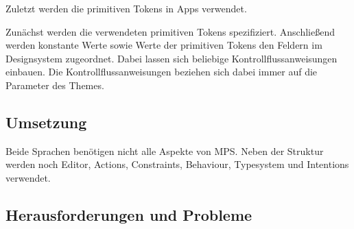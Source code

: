 Zuletzt werden die primitiven Tokens in Apps verwendet.

Zunächst werden die verwendeten primitiven Tokens spezifiziert.
Anschließend werden konstante Werte sowie Werte der primitiven Tokens den Feldern im Designsystem zugeordnet.
Dabei lassen sich beliebige Kontrollflussanweisungen einbauen.
Die Kontrollflussanweisungen beziehen sich dabei immer auf die Parameter des Themes.

\subsection{Umsetzung}\label{subsec:umsetzung}
Beide Sprachen benötigen nicht alle Aspekte von \ac{MPS}.
Neben der Struktur werden noch Editor, Actions, Constraints, Behaviour, Typesystem und Intentions verwendet.

\subsection{Herausforderungen und Probleme}\label{subsec:herausforderungen-und-probleme}
\lipsum[5]
